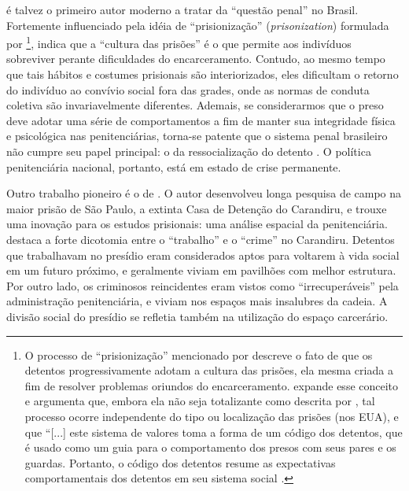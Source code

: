 \documentclass[a4paper,11pt]{article}
\begin{document}
\citet{thompson1980questao} é talvez o primeiro autor moderno a tratar da ``questão penal'' no Brasil. Fortemente influenciado pela idéia de ``prisionização'' (\textit{prisonization}) formulada por \citet{clemmer1940prison}\footnote{O processo de ``prisionização'' mencionado por \citeauthor{clemmer1940prison} descreve o fato de que os detentos progressivamente adotam a cultura das prisões, ela mesma criada a fim de resolver problemas oriundos do encarceramento. \cite{sykes1958society} expande esse conceito e argumenta que, embora ela não seja totalizante como descrita por \citeauthor{clemmer1940prison}, tal processo ocorre independente do tipo ou localização das prisões (nos EUA), e que ``[...] este sistema de valores toma a forma de um código dos detentos, que é usado como um guia para o comportamento dos presos com seus pares e os guardas. Portanto, o código dos detentos resume as expectativas comportamentais dos detentos em seu sistema social \citep[429]{paterline1999structural}.}, \citeauthor{thompson1980questao} indica que a ``cultura das prisões'' é o que permite aos indivíduos sobreviver perante dificuldades do encarceramento. Contudo, ao mesmo tempo que tais hábitos e costumes prisionais são interiorizados, eles dificultam o retorno do indivíduo ao convívio social fora das grades, onde as normas de conduta coletiva são invariavelmente diferentes. Ademais, se considerarmos que o preso deve adotar uma série de comportamentos a fim de manter sua integridade física e psicológica nas penitenciárias, torna-se patente que o sistema penal brasileiro não cumpre seu papel principal: o da ressocialização do detento \citep{silva2011visao}. O política penitenciária nacional, portanto, está em estado de crise permanente.

Outro trabalho pioneiro é o de \citet[]{ramalho1979mundo}. O autor desenvolveu longa pesquisa de campo na maior prisão de São Paulo, a extinta Casa de Detenção do Carandiru, e trouxe uma inovação para os estudos prisionais: uma análise espacial da penitenciária. \citeauthor[]{ramalho1979mundo} destaca a forte dicotomia entre o ``trabalho'' e o ``crime'' no Carandiru. Detentos que trabalhavam no presídio eram considerados aptos para voltarem à vida social em um futuro próximo, e geralmente viviam em pavilhões com melhor estrutura. Por outro lado, os criminosos reincidentes eram vistos como ``irrecuperáveis'' pela administração penitenciária, e viviam nos espaços mais insalubres da cadeia. A divisão social do presídio se refletia também na utilização do espaço carcerário.
\end{document}
